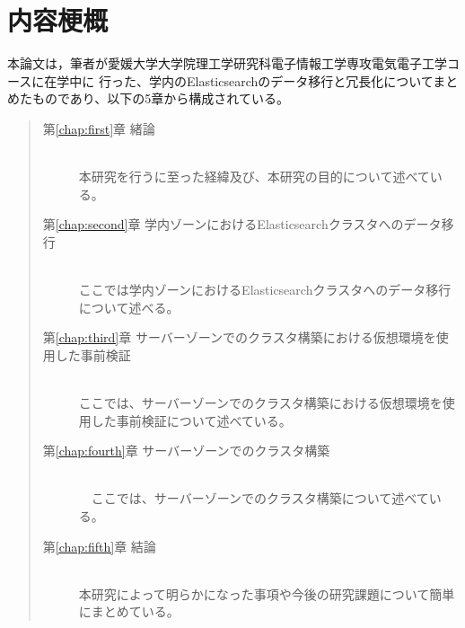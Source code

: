 \chapter*{内容梗概}

本論文は，筆者が愛媛大学大学院理工学研究科電子情報工学専攻電気電子工学コースに在学中に
行った、学内のElasticsearchのデータ移行と冗長化についてまとめたものであり、以下の5章から構成されている。\\

\begin{quote}
  \begin{description}

    \item[第\ref{chap:first}章 緒論]\ \\
     本研究を行うに至った経緯及び、本研究の目的について述べている。
    \vspace{3.0mm}
    
    \item[第\ref{chap:second}章 学内ゾーンにおけるElasticsearchクラスタへのデータ移行]\ \\ 
	  ここでは学内ゾーンにおけるElasticsearchクラスタへのデータ移行について述べる。
    \vspace{3.0mm}

    \item[第\ref{chap:third}章 サーバーゾーンでのクラスタ構築における仮想環境を使用した事前検証]\ \\ 
	  ここでは、サーバーゾーンでのクラスタ構築における仮想環境を使用した事前検証について述べている。
    \vspace{3.0mm}


    \item[第\ref{chap:fourth}章 サーバーゾーンでのクラスタ構築]\ \\
	　ここでは、サーバーゾーンでのクラスタ構築について述べている。
    \vspace{3.0mm}
     
    \item[第\ref{chap:fifth}章 結論]\ \\
      本研究によって明らかになった事項や今後の研究課題について簡単にまとめている。
  \end{description}
\end{quote}
